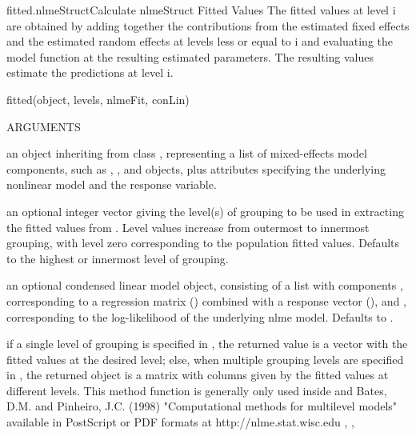 \documentclass[pdftex]{article} \usepackage{url,graphicx}
\begin{document}
\begin{Helpfile}{fitted.nlmeStruct}{Calculate nlmeStruct Fitted Values}
The fitted values at level i are obtained by adding together the
contributions from the estimated fixed effects and the estimated
random effects at levels less or equal to i and evaluating the
model function at the resulting estimated parameters. The resulting
values estimate the predictions at level i.
\begin{Example}
fitted(object, levels, nlmeFit, conLin)
\end{Example}
\begin{Argument}{ARGUMENTS}
\item[\Co{object:}]
an object inheriting from class ,
representing a list of mixed-effects model components, such as
, , and  objects, plus
attributes  specifying the underlying nonlinear model and the
response variable.
\item[\Co{level:}]
an optional integer vector giving the level(s) of grouping
to be used in extracting the fitted values from . Level
values increase from outermost to innermost grouping, with
level zero corresponding to the population fitted values. Defaults to
the highest or innermost level of grouping.
\item[\Co{conLin:}]
an optional condensed linear model object, consisting of
a list with components , corresponding to a regression
matrix () combined with a response vector (), and 
, corresponding to the log-likelihood of the
underlying nlme model. Defaults to .
\end{Argument}
if a single level of grouping is specified in ,
the returned value is a vector with the fitted values at the desired
level; else, when multiple grouping levels are specified in
, the returned object is a matrix with 
columns given by the fitted values at different levels.
 This method function is generally only used inside  and 
Bates, D.M. and Pinheiro, J.C. (1998) "Computational methods for
multilevel models" available in PostScript or PDF formats at
http://nlme.stat.wisc.edu
, ,
\end{Helpfile}
\end{document}
